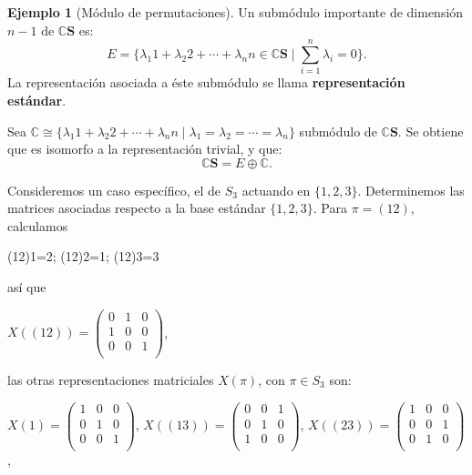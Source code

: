 \documentclass[12pt]{book}
\theoremstyle{definition}
\newtheorem{example}[theorem]{Ejemplo}
\newcounter{in}
\begin{document}
\begin{example}[Módulo de permutaciones]
  Un submódulo importante de dimensión $n-1$ de
  $\mathbb{C}\boldsymbol{S}$ es:
  \begin{equation*}
    E=\Big\{\lambda_{1}1+\lambda_{2}2+\cdots+\lambda_{n}n\in \mathbb{C}\boldsymbol{S}\mid\sum^{n}_{i=1}\lambda_{i}=0\Big\}.
  \end{equation*}
  La representación asociada a éste submódulo se llama
  \textbf{representación estándar}. 
  
  Sea $\mathbb{C}\cong
  \{\lambda_{1}1+\lambda_{2}2+\cdots+\lambda_{n}n\mid
  \lambda_{1}=\lambda_{2}=\cdots=\lambda_{n}\}$ submódulo de
  $\mathbb{C}\boldsymbol{S}$. Se obtiene que es isomorfo a la representación trivial, y que:
  \begin{equation*}
    \mathbb{C}\boldsymbol{S}=E\oplus \mathbb{C}.
  \end{equation*}
  
  Consideremos un caso específico, el de $S_{3}$ actuando en
  $\{1,2,3\}$. Determinemos las
  matrices asociadas respecto a la base estándar $\{1,2,3\}$. Para
  $\pi=(12)$, calculamos
  \begin{center}
    (12)1=2; \qquad (12)2=1; \qquad (12)3=3
  \end{center}
  así que
  \begin{center}
    $X((12))=\begin{pmatrix}
      0 & 1 & 0 \\
      1 & 0 & 0 \\
      0 & 0 & 1 \\
    \end{pmatrix}$,
  \end{center}
  las otras representaciones matriciales $X(\pi)$, con $\pi\in S_{3}$ son:
  \begin{center}
    $X(1)=\begin{pmatrix}
      1 & 0 & 0 \\
      0 & 1 & 0 \\
      0 & 0 & 1 \\
    \end{pmatrix}$,\quad  
    $X((13))=\begin{pmatrix}
      0 & 0 & 1 \\
      0 & 1 & 0 \\
      1 & 0 & 0 \\
    \end{pmatrix}$,\quad 
    $X((23))=\begin{pmatrix}
      1 & 0 & 0 \\
      0 & 0 & 1 \\
      0 & 1 & 0 \\
    \end{pmatrix}$,
  \end{center}
  

\end{example}
\end{document}
